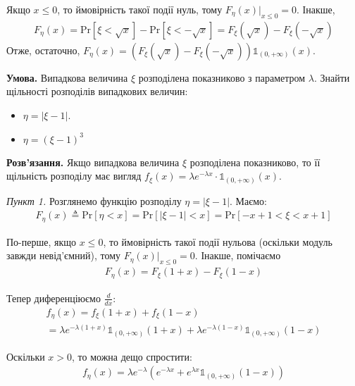 \documentclass[oneside,solution]{karazin-prob-theory-assign}
\begin{document}
Якщо $x \leq 0$, то ймовірність такої події нуль, тому $F_{\eta}(x)\Big|_{x \leq 0} = 0$. Інакше,
\begin{align}
    F_{\eta}(x) = \text{Pr}[\xi < \sqrt{x}] - \text{Pr}[\xi < -\sqrt{x}] = F_{\xi}(\sqrt{x}) - F_{\xi}(-\sqrt{x})
\end{align}
Отже, остаточно, $\boxed{F_{\eta}(x) = (F_{\xi}(\sqrt{x}) - F_{\xi}(-\sqrt{x}))\mathds{1}_{(0,+\infty)}(x)}$.


\hspace{20px}\textbf{Умова.} Випадкова величина $\xi$ розподілена показниково з параметром $\lambda$. Знайти щільності розподілів випадкових величин:
\begin{itemize}
    \item $\eta = |\xi - 1|$.
    \item $\eta = (\xi - 1)^3$
\end{itemize}

\textbf{Розв'язання.} Якщо випадкова величина $\xi$ розподілена показниково, то її щільність розподілу має вигляд $f_{\xi}(x) = \lambda e^{-\lambda x} \cdot \mathds{1}_{(0,+\infty)}(x)$. 

\textit{Пункт 1.} Розглянемо функцію розподілу $\eta = |\xi - 1|$. Маємо:
\begin{gather}
    F_{\eta}(x) \triangleq \text{Pr}[\eta < x] = \text{Pr}[|\xi-1| < x] = \text{Pr}[-x + 1 <\xi < x + 1]
\end{gather}

По-перше, якщо $x \leq 0$, то ймовірність такої події нульова (оскільки модуль завжди невід'ємний), тому $F_{\eta}(x)\Big|_{x\leq 0}=0$. Інакше, помічаємо
\begin{gather}
    F_{\eta}(x) = F_{\xi}(1+x) - F_{\xi}(1-x)
\end{gather}

Тепер диференціюємо $\frac{d}{dx}$:
\begin{gather}
    f_{\eta}(x) = f_{\xi}(1+x) + f_{\xi}(1-x)  \nonumber \\ =\lambda e^{-\lambda (1+x)}\mathds{1}_{(0,+\infty)}(1+x) + \lambda e^{-\lambda (1-x)}\mathds{1}_{(0,+\infty)}(1-x)
\end{gather}

Оскільки $x > 0$, то можна дещо спростити:
\begin{gather}
    f_{\eta}(x) = \lambda e^{-\lambda} \left(e^{-\lambda x} + e^{\lambda x}\mathds{1}_{(0,+\infty)}(1-x)\right)
\end{gather}
\end{document}
